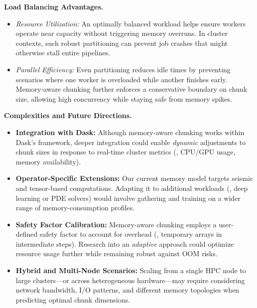 \vspace{6pt}
\noindent
\textbf{Load Balancing Advantages.}
\begin{itemize}
    \item \textit{Resource Utilization:} An optimally balanced workload helps ensure workers operate near capacity without triggering memory overruns. In cluster contexts, such robust partitioning can prevent job crashes that might otherwise stall entire pipelines.

    \item \textit{Parallel Efficiency:} Even partitioning reduces idle times by preventing scenarios where one worker is overloaded while another finishes early. Memory-aware chunking further enforces a conservative boundary on chunk size, allowing high concurrency while staying safe from memory spikes.
\end{itemize}

\vspace{6pt}
\noindent
\textbf{Complexities and Future Directions.}
\begin{itemize}
    \item \textbf{Integration with Dask:}
    Although memory-aware chunking works within Dask’s framework, deeper integration could enable \emph{dynamic} adjustments to chunk sizes in response to real-time cluster metrics (\eg, CPU/GPU usage, memory availability).
    \item \textbf{Operator-Specific Extensions:}
    Our current memory model targets seismic and tensor-based computations. Adapting it to additional workloads (\eg, deep learning or PDE solvers) would involve gathering and training on a wider range of memory-consumption profiles.
    \item \textbf{Safety Factor Calibration:}
    Memory-aware chunking employs a user-defined safety factor to account for overhead (\eg, temporary arrays in intermediate steps). Research into an \emph{adaptive} approach could optimize resource usage further while remaining robust against \ac{OOM} risks.
    \item \textbf{Hybrid and Multi-Node Scenarios:}
    Scaling from a single \ac{HPC} node to large clusters—or across heterogeneous hardware—may require considering network bandwidth, \ac{I/O} patterns, and different memory topologies when predicting optimal chunk dimensions.
\end{itemize}

